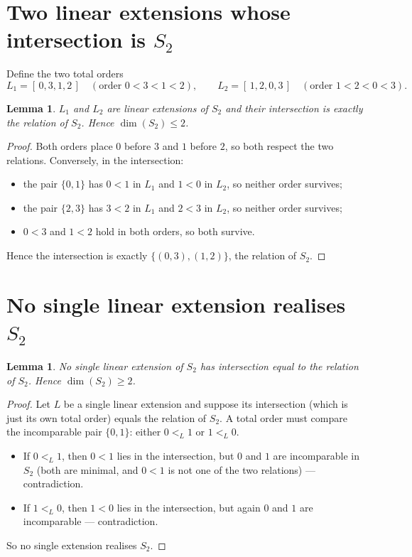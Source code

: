 \documentclass[11pt]{article}
\newtheorem{lemma}[theorem]{Lemma}
\theoremstyle{definition}
\theoremstyle{remark}
\begin{document}
\section{Two linear extensions whose intersection is \texorpdfstring{$S_2$}{S2}}

Define the two total orders
\[
L_1 = [\,0,3,1,2\,] \quad(\text{order } 0<3<1<2),
\qquad
L_2 = [\,1,2,0,3\,] \quad(\text{order } 1<2<0<3).
\]

\begin{lemma}\label{lem:upper}
$L_1$ and $L_2$ are linear extensions of $S_2$ and their intersection is
exactly the relation of $S_2$. Hence $\dim(S_2) \le 2$.
\end{lemma}

\begin{proof}
Both orders place $0$ before $3$ and $1$ before $2$, so both respect the two
relations. Conversely, in the intersection:
\begin{itemize}
\item the pair $\{0,1\}$ has $0<1$ in $L_1$ and $1<0$ in $L_2$, so neither
  order survives;
\item the pair $\{2,3\}$ has $3<2$ in $L_1$ and $2<3$ in $L_2$, so neither
  order survives;
\item $0<3$ and $1<2$ hold in both orders, so both survive.
\end{itemize}
Hence the intersection is exactly $\{(0,3),(1,2)\}$, the relation of $S_2$.
\end{proof}

\section{No single linear extension realises \texorpdfstring{$S_2$}{S2}}

\begin{lemma}\label{lem:lower}
No single linear extension of $S_2$ has intersection equal to the relation of
$S_2$. Hence $\dim(S_2) \ge 2$.
\end{lemma}

\begin{proof}
Let $L$ be a single linear extension and suppose its intersection (which is
just its own total order) equals the relation of $S_2$. A total order must
compare the incomparable pair $\{0,1\}$: either $0 <_L 1$ or $1 <_L 0$.
\begin{itemize}
\item If $0 <_L 1$, then $0<1$ lies in the intersection, but $0$ and $1$ are
  incomparable in $S_2$ (both are minimal, and $0<1$ is not one of the two
  relations) --- contradiction.
\item If $1 <_L 0$, then $1<0$ lies in the intersection, but again $0$ and $1$
  are incomparable --- contradiction.
\end{itemize}
So no single extension realises $S_2$.
\end{proof}
\end{document}
